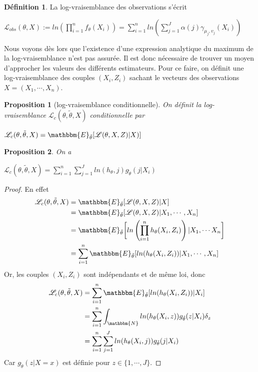 \documentclass[frenchb]{report}
\newcommand{\N}{\mathbbm{N}}
\newcommand{\1}{\mathbbm{1}}
\newcommand{\E}{\mathbbm{E}}
\newcommand{\lv}{\mathcal{L}}
\newcommand{\thetat}{\tilde{\theta}}
\newtheorem{prop}{Proposition}
\theoremstyle{definition}\newtheorem{defn}{Définition}
\theoremstyle{definition}\newtheorem{exm}{Exemple}
\theoremstyle{definition}\newtheorem{nota}{Notation}
\theoremstyle{definition}\newtheorem{rem}{Remarque}
\begin{document}
\begin{defn} 
La log-vraisemblance des observations s'écrit 
\begin{center} $\mathcal{L}_{obs}(\theta,X) := ln\left( \displaystyle\prod_{i=1}^n f_\theta(X_i) \right) = \displaystyle\sum_{i=1}^nln\left( \sum_{j=1}^J \alpha(j) \gamma_{\mu_j, v_j}(X_i) \right)$ \end{center}
\end{defn}

Nous voyons dès lors que l'existence d'une expression analytique du maximum de la log-vraisemblance n'est pas assurée. Il est donc nécessaire de trouver un moyen d'approcher les valeurs des différents estimateurs. \newline
Pour ce faire, on définit une log-vraisemblance des couples $(X_i,Z_i)$ sachant le vecteurs des observations $X = (X_1,\cdots,X_n)$.
\begin{prop}[log-vraisemblance conditionnelle]
On définit la log-vraisemblance $\lv_{c}(\theta, \thetat, X) $ conditionnelle par
\begin{center} $\lv_{c}(\theta, \thetat, X) = \E_{\thetat}[\lv(\theta,X,Z)|X)]$ \end{center}
\end{prop}

\begin{prop}
On a
\begin{center} $\lv_{c}(\theta, \thetat, X) = \displaystyle\sum_{i=1}^n\sum_{j=1}^J ln(h_\theta ,j)  g_{\thetat}(j|X_i)$ \end{center}
\end{prop}

\begin{proof}
En effet
\begin{align*}
\lv_{c}(\theta, \thetat, X) &= \E_{\thetat}[\lv(\theta,X,Z)|X] \\
&= \E_{\thetat}[\lv(\theta,X,Z)|X_1, \cdots, X_n]\\
&=  \E_{\thetat}\bigg[\displaystyle ln\left(\prod_{i=1}^n  h_\theta(X_i,Z_i)\right) |X_1,\cdots X_n \bigg]\\
&= \displaystyle\sum_{i=1}^n  \E_{\thetat}[ln(h_\theta(X_i,Z_i))|X_1,\cdots,X_n]\\
\end{align*}
Or, les couples $(X_i,Z_i)$ sont indépendants et de même loi, donc
\begin{align*}
\lv_{c}(\theta, \thetat, X) &= \displaystyle\sum_{i=1}^n  \E_{\thetat}[ln(h_\theta(X_i,Z_i))|X_i]\\
&= \displaystyle\sum_{i=1}^n \int_{\N} ln(h_\theta(X_i,z)) g_{\thetat} (z|X_i) \delta_z\\
&= \displaystyle\sum_{i=1}^n\sum_{j=1}^J ln(h_\theta(X_i ,j))  g_{\thetat}(j|X_i)\\
\end{align*}
Car $g_{\thetat}(z | X = x)$ est définie pour $z\in \{1,\cdots,J\}$.
\end{proof}
\end{document}
